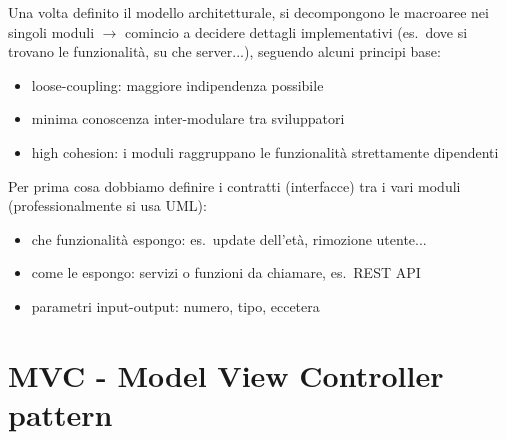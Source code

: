 Una volta definito il modello architetturale, si decompongono le macroaree nei singoli moduli $\rightarrow$ comincio a decidere dettagli implementativi (es.~dove si trovano le funzionalit\`a, su che server...), seguendo alcuni principi base:
\begin{itemize}
  \item loose-coupling: maggiore indipendenza possibile
  \item minima conoscenza inter-modulare tra sviluppatori
  \item high cohesion: i moduli raggruppano le funzionalit\`a strettamente dipendenti
\end{itemize}

Per prima cosa dobbiamo definire i contratti (interfacce) tra i vari moduli (professionalmente si usa UML):
\begin{itemize}
  \item che funzionalit\`a espongo: es.~update dell'et\`a, rimozione utente...
  \item come le espongo: servizi o funzioni da chiamare, es.~REST API
  \item parametri input-output: numero, tipo, eccetera
\end{itemize}

\section{MVC - Model View Controller pattern}




